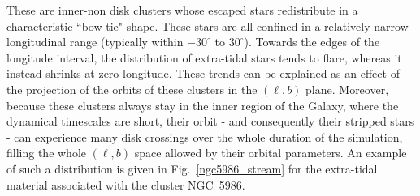             These are inner-non disk clusters whose escaped stars redistribute in a characteristic ``bow-tie" shape. These stars are all confined in a relatively narrow longitudinal range (typically within $-30^\circ$ to $30^\circ$). Towards the edges of the longitude interval, the distribution of extra-tidal stars tends to flare, whereas it instead shrinks at zero longitude. These trends can be explained as an effect of the projection of the orbits of these clusters in the $(\ell, b)$ plane.  Moreover, because these clusters always stay in the inner region of the Galaxy, where the dynamical timescales are short, their orbit - and consequently their stripped stars - can experience many disk crossings over the whole duration of the simulation, filling the whole $(\ell, b)$ space allowed by their orbital parameters. An example of such a distribution is given in Fig.~\ref{ngc5986_stream} for the extra-tidal material associated with the cluster NGC~5986.
            \twocolumn
